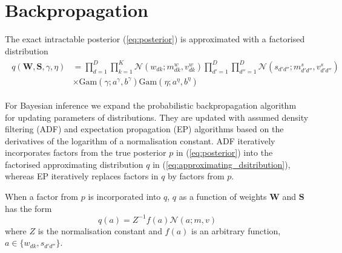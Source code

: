 \documentclass{article}
\begin{document}

%


\section{Backpropagation}
\label{sec:backpropagation}

The exact intractable posterior (\ref{eq:posterior}) is approximated with a factorised distribution
\begin{align}
\label{eq:approximating_dsitribution}
\begin{split}
q(\mathbf{W}, \mathbf{S}, \gamma, \eta) &= \prod_{d=1}^D\prod_{k=1}^K \mathcal{N}(w_{dk} ; m^w_{dk}, v^w_{dk}) \prod_{d'=1}^D\prod_{d''=1}^D \mathcal{N}(s_{d'd''} ; m^s_{d'd''}, v^s_{d'd''}) \\
&\times \text{Gam}(\gamma; a^\gamma, b^\gamma) \text{Gam}(\eta; a^\eta, b^\eta)
\end{split}
\end{align}

For Bayesian inference we expand the probabilistic backpropagation algorithm~\cite{hernandez2015probabilistic} for updating parameters of distributions. They are updated with assumed density filtering (ADF) and expectation propagation (EP) algorithms based on the derivatives of the logarithm of a normalisation constant. ADF iteratively incorporates factors from the true posterior $p$ in (\ref{eq:posterior}) into the factorised approximating distribution $q$ in (\ref{eq:approximating_dsitribution}), whereas EP iteratively replaces factors in $q$ by factors from $p$.

When a factor from $p$ is incorporated into $q$, $q$ as a function of weights $\mathbf{W}$ and $\mathbf{S}$ has the form
\begin{equation}
q(a) = Z^{-1}f(a)\mathcal{N}(a; m, v)
\end{equation}
where $Z$ is the normalisation constant and $f(a)$ is an arbitrary function, $a \in \{w_{dk}, s_{d'd''}\}$.
\end{document}
